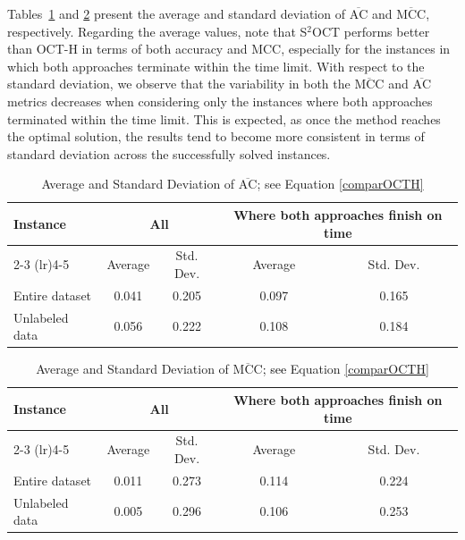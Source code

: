 \documentclass[a4paper,american,reqno]{amsart}
\newcommand{\AC}{\text{AC}}
\newcommand{\MCC}{\text{MCC}}
\newcommand{\rev}[1]{#1}
\newcommand{\revTwo}[1]{\textcolor{black}{#1}}
\begin{document}
\rev{Tables~\ref{tab:AC_results} and \ref{tab:MC_results} present the
  average and standard deviation of $\overline{\AC}$ and
  $\overline{\MCC}$, respectively.
Regarding the average values, note that S$^2$OCT performs better than
OCT-H in terms of both accuracy and MCC, especially for the instances
in which both approaches terminate within the time limit. With respect
to the standard deviation, we observe that the variability in both the
$\overline{\MCC}$ and $\overline{\AC}$ metrics decreases when
considering only the instances where both approaches terminated within
the time limit. This is expected, as once the method reaches the optimal
solution, the results tend to become more consistent in terms of
standard deviation across the successfully solved instances.}

\begin{table}[h!]
\centering
\caption{\rev{Average and Standard Deviation of $\overline{\AC}$; see
    Equation \eqref{comparOCTH}}}
\label{tab:AC_results}
\begin{tabular}{l c c c c}
\toprule
Instance & \multicolumn{2}{c}{All} & \multicolumn{2}{c}{Where both  approaches finish on time} \\
\cmidrule(lr){2-3} \cmidrule(lr){4-5}
 & Average & Std. Dev.   & Average  & Std. Dev.  \\
\midrule
Entire dataset &  0.041& 0.205 & 0.097  &0.165  \\
Unlabeled data & 0.056 & 0.222  &0.108 & 0.184 \\
\bottomrule
\end{tabular}
\end{table}
\begin{table}[h!]
\centering
\caption{\rev{Average and Standard Deviation of $\overline{\MCC}$\revTwo{; see}
    Equation \eqref{comparOCTH}}}
\label{tab:MC_results}
\begin{tabular}{l c c c c}
\toprule
Instance & \multicolumn{2}{c}{All} & \multicolumn{2}{c}{Where both  approaches finish on time} \\
\cmidrule(lr){2-3} \cmidrule(lr){4-5}
 & Average & Std. Dev.   & Average & Std. Dev. \\
\midrule
Entire dataset & 0.011 & 0.273   & 0.114   & 0.224 \\
Unlabeled data&  0.005  & 0.296  &0.106 & 0.253  \\
\bottomrule
\end{tabular}
\end{table}
\end{document}

